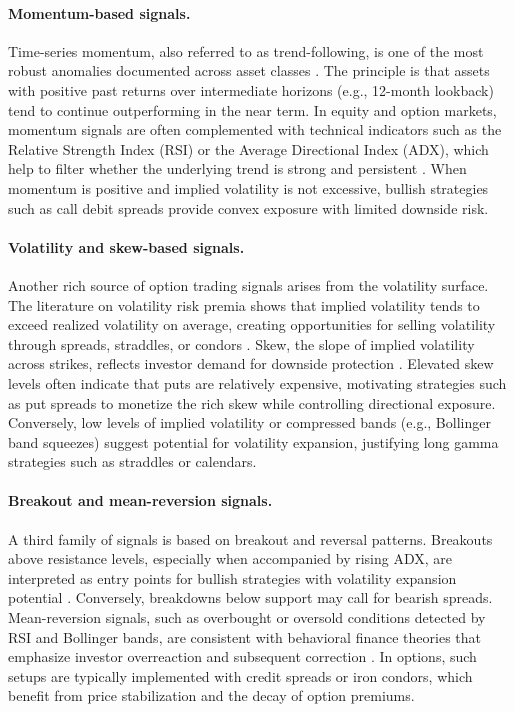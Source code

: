 \documentclass[12pt,a4paper]{report}
\begin{document}
\paragraph{Momentum-based signals.}
Time-series momentum, also referred to as trend-following, is one of the most robust anomalies documented across asset classes \citep{moskowitz2012time}. The principle is that assets with positive past returns over intermediate horizons (e.g., 12-month lookback) tend to continue outperforming in the near term. In equity and option markets, momentum signals are often complemented with technical indicators such as the Relative Strength Index (RSI) or the Average Directional Index (ADX), which help to filter whether the underlying trend is strong and persistent \citep{brock1992simple, han2009technical}. When momentum is positive and implied volatility is not excessive, bullish strategies such as call debit spreads provide convex exposure with limited downside risk.

\paragraph{Volatility and skew-based signals.}
Another rich source of option trading signals arises from the volatility surface. The literature on volatility risk premia shows that implied volatility tends to exceed realized volatility on average, creating opportunities for selling volatility through spreads, straddles, or condors \citep{carr2001empirical, bollerslev2009volatility}. Skew, the slope of implied volatility across strikes, reflects investor demand for downside protection \citep{bollen2004does}. Elevated skew levels often indicate that puts are relatively expensive, motivating strategies such as put spreads to monetize the rich skew while controlling directional exposure. Conversely, low levels of implied volatility or compressed bands (e.g., Bollinger band squeezes) suggest potential for volatility expansion, justifying long gamma strategies such as straddles or calendars.

\paragraph{Breakout and mean-reversion signals.}
A third family of signals is based on breakout and reversal patterns. Breakouts above resistance levels, especially when accompanied by rising ADX, are interpreted as entry points for bullish strategies with volatility expansion potential \citep{faber2007quantitative}. Conversely, breakdowns below support may call for bearish spreads. Mean-reversion signals, such as overbought or oversold conditions detected by RSI and Bollinger bands, are consistent with behavioral finance theories that emphasize investor overreaction and subsequent correction \citep{jegadeesh1990evidence}. In options, such setups are typically implemented with credit spreads or iron condors, which benefit from price stabilization and the decay of option premiums.
\end{document}
